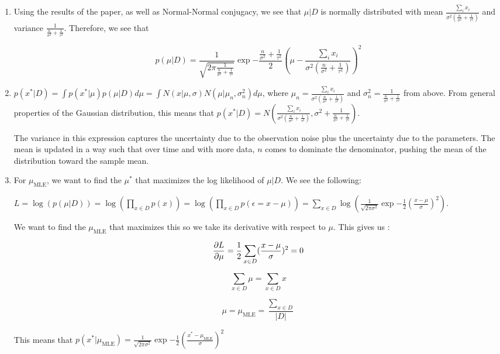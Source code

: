 \documentclass[submit]{harvardml}
\begin{document}
\begin{enumerate}
    \item Using the results of the paper, as well as Normal-Normal conjugacy, we see that $\mu|D$ is normally distributed with mean $\frac{\sum_i x_i}{\sigma^2(\frac{n}{\sigma^2} + \frac{1}{\tau^2})}$ and variance $\frac{1}{\frac{n}{\sigma^2} + \frac{1}{\tau^2}}$. Therefore, we see that 
    
    $$p(\mu|D) = \frac{1}{\sqrt{2\pi \frac{1}{\frac{n}{\sigma^2} + \frac{1}{\tau^2}}}}\exp{-\frac{\frac{n}{\sigma^2} + \frac{1}{\tau^2}}{2}(\mu - \frac{\sum_i x_i}{\sigma^2(\frac{n}{\sigma^2} + \frac{1}{\tau^2})})^2}$$
    
    \item $p(x^*|D) = \int p(x^*|\mu)p(\mu|D) d\mu = \int N(x|\mu, \sigma) N(\mu|\mu_n, \sigma_n^2)d\mu$, where $\mu_n = \frac{\sum_i x_i}{\sigma^2(\frac{n}{\sigma^2} + \frac{1}{\tau^2})}$ and $\sigma_n^2 = \frac{1}{\frac{n}{\sigma^2} + \frac{1}{\tau^2}}$ from above. From general properties of the Gaussian distribution, this means that $p(x^*|D) = N(\frac{\sum_i x_i}{\sigma^2(\frac{n}{\sigma^2} + \frac{1}{\tau^2})}, \sigma^2 + \frac{1}{\frac{n}{\sigma^2} + \frac{1}{\tau^2}})$.
    
    
    The variance in this expression captures the uncertainty due to the observation noise plus the uncertainty due to the parameters. The mean is updated in a way such that over time and with more data, $n$ comes to dominate the denominator, pushing the mean of the distribution toward the sample mean.
    
    \item For $\mu_{\text{MLE}}$, we want to find the $\mu^*$ that maximizes the log likelihood of $\mu|D$. We see the following:
    
    $L = \log(p(\mu|D)) = \log(\prod_{x\in D} p(x)) = \log(\prod_{x\in D} p(\epsilon = x - \mu)) = \sum_{x\in D} \log(\frac{1}{\sqrt{2\pi\sigma^2}}\exp{-\frac{1}{2}(\frac{x-\mu}{\sigma})^2})$.
    
    We want to find the $\mu_{\text{MLE}}$ that maximizes this so we take its derivative with respect to $\mu$. This gives us :
    
    $$\pdv{L}{\mu} = \frac{1}{2}\sum_{x \in D} (\frac{x-\mu}{\sigma})^2 = 0$$
    
    $$\sum_{x \in D} \mu = \sum_{x \in D} x$$
    
    $$\mu = \mu_{\text{MLE}} = \frac{\sum_{x \in D}}{|D|}$$
    
    This means that $p(x^*|\mu_{\text{MLE}}) = \frac{1}{\sqrt{2\pi \sigma^2}} \exp{-\frac{1}{2}(\frac{x^* - \mu_{\text{MLE}}}{\sigma})^2}$
    

\end{enumerate}
\end{document}

